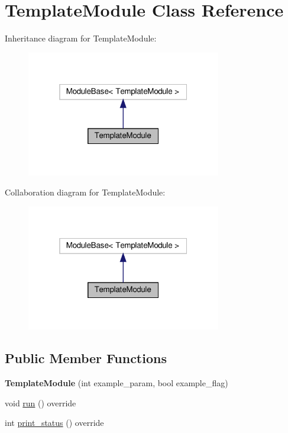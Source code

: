 \hypertarget{classTemplateModule}{}\section{Template\+Module Class Reference}
\label{classTemplateModule}


Inheritance diagram for Template\+Module\+:\nopagebreak
\begin{figure}[H]
\begin{center}
\leavevmode
\includegraphics[width=241pt]{d0/df9/classTemplateModule__inherit__graph}
\end{center}
\end{figure}


Collaboration diagram for Template\+Module\+:\nopagebreak
\begin{figure}[H]
\begin{center}
\leavevmode
\includegraphics[width=241pt]{db/d74/classTemplateModule__coll__graph}
\end{center}
\end{figure}
\subsection*{Public Member Functions}
\begin{DoxyCompactItemize}
\item 
\mbox{\label{classTemplateModule_a380d8124f74b33afe7388cd2e0d4a38e}} 
{\bfseries Template\+Module} (int example\+\_\+param, bool example\+\_\+flag)
\item 
void \hyperlink{classTemplateModule_a9ee1970fb39e76ae38e838df00e7a058}{run} () override
\item 
int \hyperlink{classTemplateModule_a0a5e50f74b8a4bc4d3102eb1487efc88}{print\+\_\+status} () override
\end{DoxyCompactItemize}

